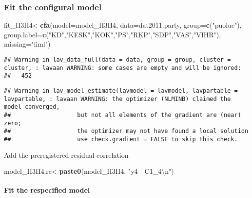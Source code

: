 \documentclass[
]{article}
\newenvironment{Shaded}{\begin{snugshade}}{\end{snugshade}}
\newcommand{\CharTok}[1]{\textcolor[rgb]{0.31,0.60,0.02}{#1}}
\newcommand{\DataTypeTok}[1]{\textcolor[rgb]{0.13,0.29,0.53}{#1}}
\newcommand{\KeywordTok}[1]{\textcolor[rgb]{0.13,0.29,0.53}{\textbf{#1}}}
\newcommand{\NormalTok}[1]{#1}
\newcommand{\StringTok}[1]{\textcolor[rgb]{0.31,0.60,0.02}{#1}}
\begin{document}
\hypertarget{fit-the-configural-model}{%
\subsubsection{Fit the configural
model}\label{fit-the-configural-model}}

\begin{Shaded}
\begin{Highlighting}[]
\NormalTok{fit_H3H4<-}\KeywordTok{cfa}\NormalTok{(}\DataTypeTok{model=}\NormalTok{model_H3H4,}
              \DataTypeTok{data=}\NormalTok{dat2011.party,}
              \DataTypeTok{group=}\KeywordTok{c}\NormalTok{(}\StringTok{"puolue"}\NormalTok{),}
              \DataTypeTok{group.label=}\KeywordTok{c}\NormalTok{(}\StringTok{"KD"}\NormalTok{,}\StringTok{"KESK"}\NormalTok{,}\StringTok{"KOK"}\NormalTok{,}\StringTok{"PS"}\NormalTok{,}\StringTok{"RKP"}\NormalTok{,}\StringTok{"SDP"}\NormalTok{,}\StringTok{"VAS"}\NormalTok{,}\StringTok{"VIHR"}\NormalTok{),}
              \DataTypeTok{missing=}\StringTok{"fiml"}\NormalTok{)}
\end{Highlighting}
\end{Shaded}

\begin{verbatim}
## Warning in lav_data_full(data = data, group = group, cluster = cluster, : lavaan WARNING: some cases are empty and will be ignored:
##   452
\end{verbatim}

\begin{verbatim}
## Warning in lav_model_estimate(lavmodel = lavmodel, lavpartable = lavpartable, : lavaan WARNING: the optimizer (NLMINB) claimed the model converged,
##                   but not all elements of the gradient are (near) zero;
##                   the optimizer may not have found a local solution
##                   use check.gradient = FALSE to skip this check.
\end{verbatim}

Add the preregistered residual correlation

\begin{Shaded}
\begin{Highlighting}[]
\NormalTok{model_H3H4.re<-}\KeywordTok{paste0}\NormalTok{(model_H3H4,}
                      \StringTok{"y4~~C1_4}\CharTok{\textbackslash{}n}\StringTok{"}\NormalTok{)}
\end{Highlighting}
\end{Shaded}

\hypertarget{fit-the-respecified-model-2}{%
\paragraph{Fit the respecified
model}\label{fit-the-respecified-model-2}}
\end{document}
